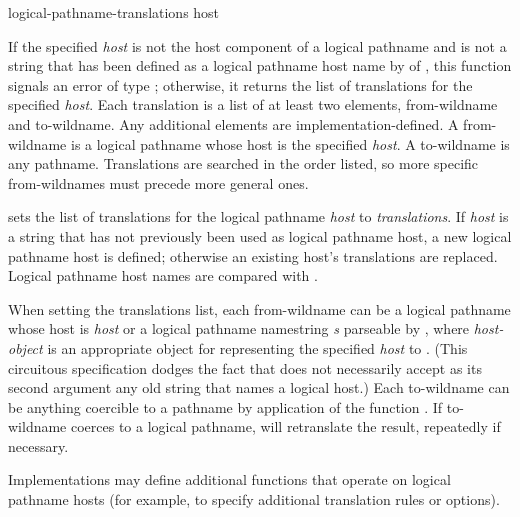 \begin{defun}[Function]
logical-pathname-translations host

    If the specified \emph{host} is not the host component of a logical pathname and is not a
    string that has been defined as a logical pathname host name by  of
    , this function signals an error of type ;
    otherwise, it returns the list of translations for the specified \emph{host}.  Each translation is
    a list of at least two elements, from-wildname and to-wildname.  Any
    additional elements are implementation-defined.  A from-wildname is a
    logical pathname whose host is the specified \emph{host}.  A to-wildname is any pathname.
    Translations are searched in the order listed, so more specific
    from-wildnames must precede more general ones.

    sets the list of translations for the logical
    pathname \emph{host} to \emph{translations}.  If \emph{host} is a string that has
    not previously been used as logical pathname host, a new logical
    pathname host is defined; otherwise an existing host's translations are
    replaced.  Logical pathname host names are compared with .

    When setting the translations list, each from-wildname can be a logical
    pathname whose host is \emph{host} or a logical pathname namestring \emph{s}
    parseable by , where \emph{host-object}
    is an appropriate object for representing the specified \emph{host} to
    .  (This circuitous specification dodges the fact
    that  does not necessarily accept as its second argument
    any old string that names a logical host.)
    Each to-wildname can be anything coercible to a pathname by application of
    the function .
    If to-wildname coerces to a logical pathname,
     will retranslate the result, repeatedly if
    necessary.

    Implementations may define additional functions that operate on
    logical pathname hosts (for example, to specify additional translation
    rules or options).
\end{defun}

